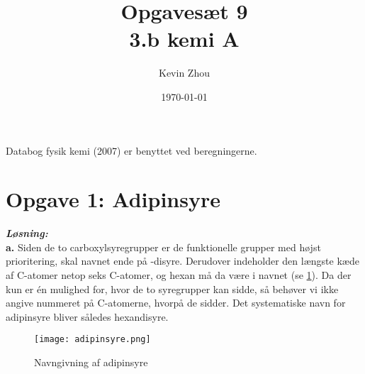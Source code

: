 \documentclass{report}
\title{Opgavesæt 9\\
{\Large \textbf{3.b kemi A}}}
\author{Kevin Zhou}
\date{\today}
\newcommand{\sol}{\setlength{\parindent}{0cm}\textbf{\textit{Løsning:}}\setlength{\parindent}{1cm}}
\begin{document}
\maketitle
\begin{note}
  Databog fysik kemi (2007) er benyttet ved beregningerne.
\end{note}
\section*{Opgave 1: Adipinsyre}
\sol \\
\textbf{a.}
Siden de to carboxylsyregrupper er de funktionelle grupper med højst prioritering, skal navnet ende på -disyre.
Derudover indeholder den længste kæde af C-atomer netop seks C-atomer, og hexan må da være i navnet (se \cref{fig:adipinsyre}).
Da der kun er én mulighed for, hvor de to syregrupper kan sidde, så behøver vi ikke angive nummeret på C-atomerne, hvorpå de sidder.
Det systematiske navn for adipinsyre bliver således hexandisyre.
\begin{figure}[H]
\begin{center}
  \texttt{[image: adipinsyre.png]}
\end{center}
\caption{Navngivning af adipinsyre}
\label{fig:adipinsyre}
\end{figure}
\end{document}
